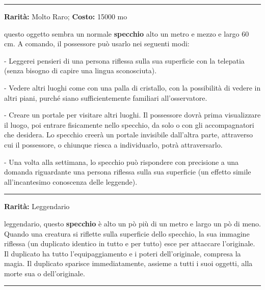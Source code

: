 \begin{multicols}{2}
\smallskip\noindent\rule{\linewidth}{2pt}  \hypertarget{Specchiodell'Abilita'mentale}{}\medskip{}\noindent\label{Specchiodell'Abilita'mentale}

\textbf{Rarità:} Molto Raro; \textbf{Costo:} 15000 mo

questo oggetto sembra un normale \textbf{specchio} alto un metro e mezzo e largo 60 cm. A comando, il possessore può usarlo nei seguenti modi:

- Leggerei pensieri di una persona riflessa sulla sua superficie con la telepatia (senza bisogno di capire una lingua sconosciuta).

- Vedere altri luoghi come con una palla di cristallo, con la possibilità di vedere in altri piani, purché siano sufficientemente familiari all'osservatore.

- Creare un portale per visitare altri luoghi. Il possessore dovrà prima visualizzare il luogo, poi entrare fisicamente nello specchio, da solo o con gli accompagnatori che desidera. Lo specchio creerà un portale invisibile dall'altra parte, attraverso cui il possessore, o chiunque riesca a individuarlo, potrà attraversarlo.

- Una volta alla settimana, lo specchio può rispondere con precisione a una domanda riguardante una persona riflessa sulla sua superficie (un effetto simile all'incantesimo conoscenza delle leggende).

\smallskip\noindent\rule{\linewidth}{2pt}  \hypertarget{SpecchiodellaDuplicazione}{}\medskip{}\noindent\label{SpecchiodellaDuplicazione}

\textbf{Rarità:} Leggendario

leggendario, questo \textbf{specchio} è alto un pò più di un metro e largo un pò di meno. Quando una creatura si riflette sulla superficie dello specchio, la sua immagine riflessa (un duplicato identico in tutto e per tutto) esce per attaccare l'originale. Il duplicato ha tutto l'equipaggiamento e i poteri dell'originale, compresa la magia. Il duplicato sparisce immediatamente, assieme a tutti i suoi oggetti, alla morte sua o dell'originale.

\smallskip\noindent\rule{\linewidth}{2pt}  \hypertarget{SpecchioIntrappolaVita}{}\medskip{}\noindent\label{SpecchioIntrappolaVita}


\end{multicols}
